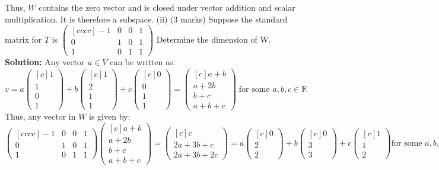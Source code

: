 \documentclass{article}
\begin{document}
Thus, $W$ contains the zero vector and is closed under vector addition and scalar multiplication. It is therefore a subspace.
\newline
\newline
(ii) (3 marks) Suppose the standard matrix for $T$ is
$\begin{pmatrix}[cccc]
    -1 & 0 & 0 & 1 \\
    0 & 1 & 0 & 1 \\
    1 & 0 & 1 & 1
\end{pmatrix}$ Determine the dimension of W.
\newline
\textbf{Solution:}
Any vector $u \in V$ can be written as:
$$v = a\begin{pmatrix}[c] 1 \\ 1 \\ 0 \\ 1 \end{pmatrix} + b\begin{pmatrix}[c] 1 \\ 2 \\ 1 \\ 1 \end{pmatrix} + c \begin{pmatrix}[c] 0 \\ 0 \\ 1 \\ 1 \end{pmatrix} =
\begin{pmatrix}[c] a + b \\ a + 2b \\ b + c \\ a + b + c \end{pmatrix} \; \text{for some } a, b, c \in \mathbb{R}$$
Thus, any vector in $W$ is given by:
$$\begin{pmatrix}[cccc]
    -1 & 0 & 0 & 1 \\
    0 & 1 & 0 & 1 \\
    1 & 0 & 1 & 1
\end{pmatrix}
\begin{pmatrix}[c] a + b \\ a + 2b \\ b + c \\ a + b + c \end{pmatrix}
= \begin{pmatrix}[c] c \\ 2a + 3b + c \\ 2a + 3b + 2c \end{pmatrix} = a\begin{pmatrix}[c] 0 \\ 2 \\ 2  \end{pmatrix} + b\begin{pmatrix}[c] 0 \\ 3 \\ 3 \end{pmatrix} + c \begin{pmatrix}[c] 1 \\ 1 \\ 2 \end{pmatrix} \text{for some } a, b, c \in \mathbb{R} $$
\end{document}
